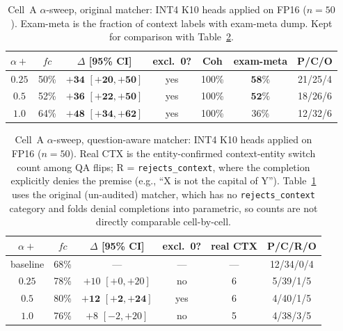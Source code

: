 \documentclass{article} %
\begin{document}
\begin{table}[h]
\caption{Cell~A $\alpha$-sweep, original matcher: INT4 K10 heads applied on FP16 ($n{=}50$). Exam-meta is the fraction of context labels with exam-meta dump. Kept for comparison with Table~\ref{tab:cell-a-alpha-qa}.}
\label{tab:cell-a-alpha}
\centering\small
\begin{tabular}{ccccccc}
\toprule
$\alpha{+}$ & $fc$ & $\Delta$ [95\% CI] & excl.\ 0? & Coh & exam-meta & P/C/O \\
\midrule
$0.25$ & 50\% & $\mathbf{+34}$ $\mathbf{[+20,+50]}$ & yes & 100\% & $\mathbf{58\%}$ & 21/25/4 \\
$0.5$ & 52\% & $\mathbf{+36}$ $\mathbf{[+22,+50]}$ & yes & 100\% & $\mathbf{52\%}$ & 18/26/6 \\
$1.0$ & 64\% & $\mathbf{+48}$ $\mathbf{[+34,+62]}$ & yes & 100\% & 36\% & 12/32/6 \\
\bottomrule
\end{tabular}
\end{table}

\begin{table}[h]
\caption{Cell~A $\alpha$-sweep, question-aware matcher: INT4 K10 heads applied on FP16 ($n{=}50$). Real CTX is the entity-confirmed context-entity switch count among QA flips; R = \texttt{rejects\_context}, where the completion explicitly denies the premise (e.g., ``X is not the capital of Y''). Table~\ref{tab:cell-a-alpha} uses the original (un-audited) matcher, which has no \texttt{rejects\_context} category and folds denial completions into parametric, so counts are not directly comparable cell-by-cell.}
\label{tab:cell-a-alpha-qa}
\centering\small
\begin{tabular}{cccccc}
\toprule
$\alpha{+}$ & $fc$ & $\Delta$ [95\% CI] & excl.\ 0? & real CTX & P/C/R/O \\
\midrule
baseline & 68\% & --- & --- & --- & 12/34/0/4 \\
$0.25$ & 78\% & $+10$ $[+0,+20]$ & no & 6 & 5/39/1/5 \\
$0.5$ & 80\% & $\mathbf{+12}$ $\mathbf{[+2,+24]}$ & yes & 6 & 4/40/1/5 \\
$1.0$ & 76\% & $+8$ $[-2,+20]$ & no & 5 & 4/38/3/5 \\
\bottomrule
\end{tabular}
\end{table}
\end{document}

